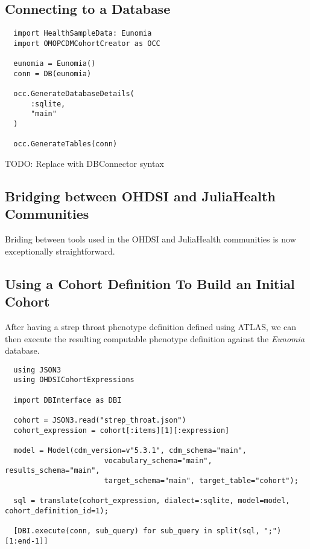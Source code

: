 \documentclass{juliacon}
\begin{document}
\subsection{Connecting to a Database}

\begin{verbatim}
  import HealthSampleData: Eunomia
  import OMOPCDMCohortCreator as OCC

  eunomia = Eunomia()
  conn = DB(eunomia)

  occ.GenerateDatabaseDetails(
      :sqlite,
      "main"
  )

  occ.GenerateTables(conn)
\end{verbatim}

TODO: Replace with DBConnector syntax

\subsection{Bridging between OHDSI and JuliaHealth Communities}

Briding between tools used in the OHDSI and JuliaHealth communities is now exceptionally straightforward.


\subsection{Using a Cohort Definition To Build an Initial Cohort}

After having a strep throat phenotype definition defined using ATLAS, we can then execute the resulting computable phenotype definition against the \textit{Eunomia} database.

\begin{verbatim}
  using JSON3 
  using OHDSICohortExpressions

  import DBInterface as DBI

  cohort = JSON3.read("strep_throat.json")
  cohort_expression = cohort[:items][1][:expression]

  model = Model(cdm_version=v"5.3.1", cdm_schema="main",
                       vocabulary_schema="main", results_schema="main",
                       target_schema="main", target_table="cohort");

  sql = translate(cohort_expression, dialect=:sqlite, model=model, cohort_definition_id=1);

  [DBI.execute(conn, sub_query) for sub_query in split(sql, ";")[1:end-1]]
\end{verbatim}
\end{document}
